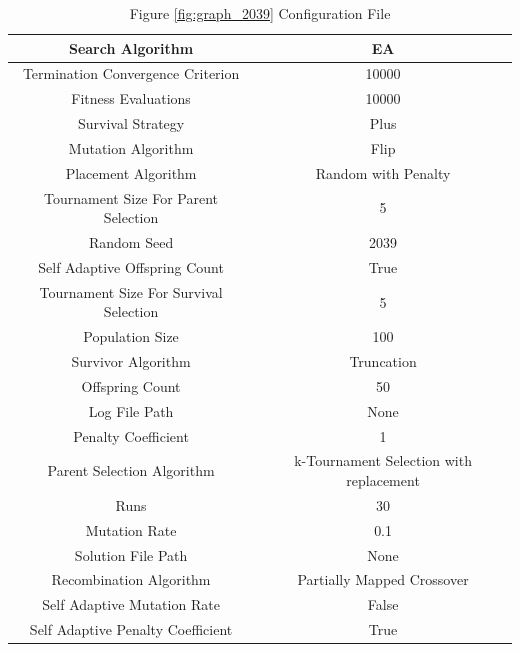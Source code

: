 \documentclass{standalone}
\begin{document}
\begin{table}[!htb]
	\centering
	\caption{Figure \ref{fig:graph_2039} Configuration File}
	\label{tab:graph_2039}
	\begin{tabular}{| c | c |}
		\hline
		Search Algorithm		& EA		 \\
		\hline
		Termination Convergence Criterion		& 10000		 \\
		\hline
		Fitness Evaluations		& 10000		 \\
		\hline
		Survival Strategy		& Plus		 \\
		\hline
		Mutation Algorithm		& Flip		 \\
		\hline
		Placement Algorithm		& Random with Penalty		 \\
		\hline
		Tournament Size For Parent Selection		& 5		 \\
		\hline
		Random Seed		& 2039		 \\
		\hline
		Self Adaptive Offspring Count		& True		 \\
		\hline
		Tournament Size For Survival Selection		& 5		 \\
		\hline
		Population Size		& 100		 \\
		\hline
		Survivor Algorithm		& Truncation		 \\
		\hline
		Offspring Count		& 50		 \\
		\hline
		Log File Path		& None		 \\
		\hline
		Penalty Coefficient		& 1		 \\
		\hline
		Parent Selection Algorithm		& k-Tournament Selection with replacement		 \\
		\hline
		Runs		& 30		 \\
		\hline
		Mutation Rate		& 0.1		 \\
		\hline
		Solution File Path		& None		 \\
		\hline
		Recombination Algorithm		& Partially Mapped Crossover		 \\
		\hline
		Self Adaptive Mutation Rate		& False		 \\
		\hline
		Self Adaptive Penalty Coefficient		& True		 \\
		\hline
	\end{tabular}
\end{table}
\end{document}
